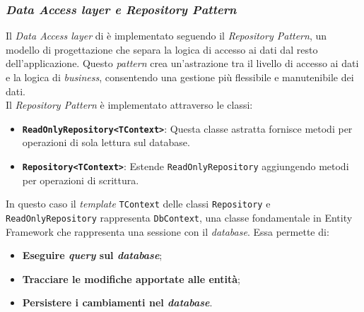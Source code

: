 \subsubsection{\textit{Data Access layer e Repository Pattern}}
Il \textit{Data Access layer} di {\movi} è implementato seguendo il \textit{Repository Pattern}, un modello di progettazione 
che separa la logica di accesso ai dati dal resto dell'applicazione. Questo \textit{pattern} crea un'astrazione tra il livello 
di accesso ai dati e la logica di \textit{business}, consentendo una gestione più flessibile e manutenibile dei dati.\\
Il \textit{Repository Pattern} è implementato attraverso le classi:
\begin{itemize}
\item \texttt{\textbf{ReadOnlyRepository<TContext>}}: Questa classe astratta fornisce metodi per operazioni di sola lettura sul database.
\item \texttt{\textbf{Repository<TContext>}}: Estende \texttt{ReadOnlyRepository} aggiungendo metodi per operazioni di scrittura.
\end{itemize}
In questo caso il \textit{template} \texttt{TContext} delle classi \texttt{Repository} e \texttt{ReadOnlyRepository} 
rappresenta \texttt{DbContext}, una classe fondamentale in Entity Framework che rappresenta una sessione con il 
\textit{database}. Essa permette di:
\begin{itemize}
      \item \textbf{Eseguire \textit{query} sul \textit{database}};
      \item \textbf{Tracciare le modifiche apportate alle entità};
      \item \textbf{Persistere i cambiamenti nel \textit{database}}.
\end{itemize}

